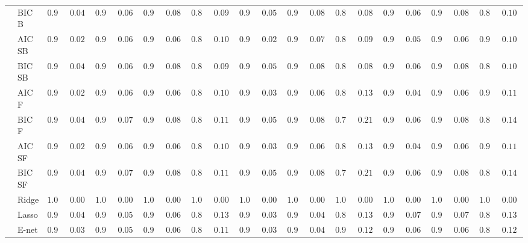 \begin{tabular}{p{0.2cm}p{1cm}|p{0.6cm}p{0.6cm}|p{0.6cm}p{0.6cm}p{0.6cm}p{0.6cm}p{0.6cm}p{0.6cm}|p{0.6cm}p{0.6cm}p{0.6cm}p{0.6cm}p{0.6cm}p{0.6cm}|p{0.6cm}p{0.6cm}p{0.6cm}p{0.6cm}p{0.6cm}p{0.6cm}}
 & BIC B  & $0.990$ & $0.0438$ & $0.972$ & $0.0697$ & $0.960$ & $0.0804$ & $0.860$ & $0.0921$ & $0.986$ & $0.0513$ & $0.948$ & $0.0882$ & $0.842$ & $0.0867$ & $0.978$ & $0.0629$ & $0.952$ & $0.0858$ & $0.872$ & $0.1006$ \\
 & AIC SB  & $0.998$ & $0.0200$ & $0.980$ & $0.0603$ & $0.978$ & $0.0629$ & $0.898$ & $0.1005$ & $0.996$ & $0.0281$ & $0.970$ & $0.0718$ & $0.868$ & $0.0952$ & $0.986$ & $0.0513$ & $0.978$ & $0.0629$ & $0.910$ & $0.1040$ \\
 & BIC SB  & $0.990$ & $0.0438$ & $0.972$ & $0.0697$ & $0.960$ & $0.0804$ & $0.860$ & $0.0921$ & $0.986$ & $0.0513$ & $0.950$ & $0.0870$ & $0.842$ & $0.0867$ & $0.978$ & $0.0629$ & $0.952$ & $0.0858$ & $0.872$ & $0.1006$ \\
 & AIC F  & $0.998$ & $0.0200$ & $0.980$ & $0.0603$ & $0.978$ & $0.0629$ & $0.898$ & $0.1005$ & $0.994$ & $0.0343$ & $0.972$ & $0.0697$ & $0.858$ & $0.1342$ & $0.988$ & $0.0477$ & $0.974$ & $0.0676$ & $0.902$ & $0.1155$ \\
 & BIC F  & $0.990$ & $0.0438$ & $0.970$ & $0.0718$ & $0.958$ & $0.0819$ & $0.832$ & $0.1162$ & $0.982$ & $0.0575$ & $0.948$ & $0.0882$ & $0.718$ & $0.2148$ & $0.978$ & $0.0629$ & $0.948$ & $0.0882$ & $0.840$ & $0.1477$ \\
 & AIC SF  & $0.998$ & $0.0200$ & $0.980$ & $0.0603$ & $0.978$ & $0.0629$ & $0.898$ & $0.1005$ & $0.994$ & $0.0343$ & $0.972$ & $0.0697$ & $0.854$ & $0.1329$ & $0.988$ & $0.0477$ & $0.972$ & $0.0697$ & $0.902$ & $0.1155$ \\
 & BIC SF  & $0.990$ & $0.0438$ & $0.970$ & $0.0718$ & $0.958$ & $0.0819$ & $0.832$ & $0.1162$ & $0.982$ & $0.0575$ & $0.948$ & $0.0882$ & $0.718$ & $0.2148$ & $0.978$ & $0.0629$ & $0.948$ & $0.0882$ & $0.840$ & $0.1477$ \\
 & Ridge  & $1.000$ & $0.0000$ & $1.000$ & $0.0000$ & $1.000$ & $0.0000$ & $1.000$ & $0.0000$ & $1.000$ & $0.0000$ & $1.000$ & $0.0000$ & $1.000$ & $0.0000$ & $1.000$ & $0.0000$ & $1.000$ & $0.0000$ & $1.000$ & $0.0000$ \\
 & Lasso  & $0.990$ & $0.0438$ & $0.984$ & $0.0545$ & $0.972$ & $0.0697$ & $0.878$ & $0.1360$ & $0.992$ & $0.0394$ & $0.988$ & $0.0477$ & $0.890$ & $0.1314$ & $0.968$ & $0.0737$ & $0.962$ & $0.0789$ & $0.856$ & $0.1336$ \\
 & E-net  & $0.992$ & $0.0394$ & $0.986$ & $0.0513$ & $0.976$ & $0.0653$ & $0.896$ & $0.1188$ & $0.994$ & $0.0343$ & $0.990$ & $0.0438$ & $0.908$ & $0.1285$ & $0.972$ & $0.0697$ & $0.972$ & $0.0697$ & $0.870$ & $0.1283$ \\

\end{tabular}
